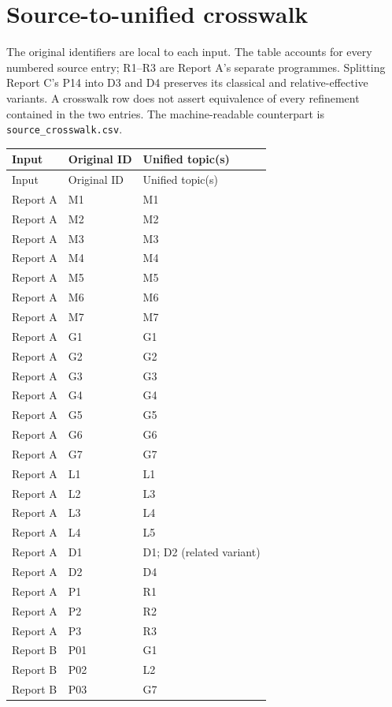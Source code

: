 \documentclass[11pt,a4paper]{article}
\theoremstyle{definition}\newtheorem{definition}[theorem]{Definition}
\theoremstyle{remark}\newtheorem{remark}[theorem]{Remark}
\begin{document}
\appendix
\section{Source-to-unified crosswalk}
\label{app:crosswalk}
The original identifiers are local to each input. The table accounts for every numbered source entry; R1--R3 are Report A's separate programmes. Splitting Report C's P14 into D3 and D4 preserves its classical and relative-effective variants. A crosswalk row does not assert equivalence of every refinement contained in the two entries. The machine-readable counterpart is \texttt{source\_crosswalk.csv}.
\small
\begin{longtable}{@{}p{}p{}p{}@{}}
\toprule Input & Original ID & Unified topic(s) \\\midrule
\endfirsthead
\toprule Input & Original ID & Unified topic(s) \\\midrule
\endhead
\bottomrule\endfoot
Report A & M1 & M1 \\
Report A & M2 & M2 \\
Report A & M3 & M3 \\
Report A & M4 & M4 \\
Report A & M5 & M5 \\
Report A & M6 & M6 \\
Report A & M7 & M7 \\
Report A & G1 & G1 \\
Report A & G2 & G2 \\
Report A & G3 & G3 \\
Report A & G4 & G4 \\
Report A & G5 & G5 \\
Report A & G6 & G6 \\
Report A & G7 & G7 \\
Report A & L1 & L1 \\
Report A & L2 & L3 \\
Report A & L3 & L4 \\
Report A & L4 & L5 \\
Report A & D1 & D1; D2 (related variant) \\
Report A & D2 & D4 \\
Report A & P1 & R1 \\
Report A & P2 & R2 \\
Report A & P3 & R3 \\
Report B & P01 & G1 \\
Report B & P02 & L2 \\
Report B & P03 & G7 \\

\end{longtable}
\end{document}
